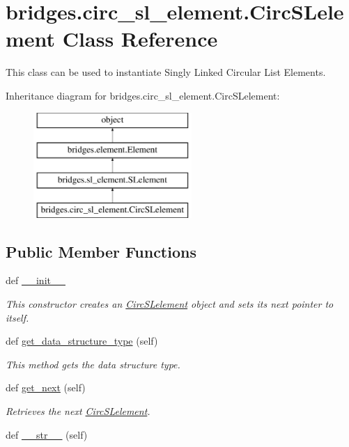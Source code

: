 \hypertarget{classbridges_1_1circ__sl__element_1_1_circ_s_lelement}{}\section{bridges.\+circ\+\_\+sl\+\_\+element.\+Circ\+S\+Lelement Class Reference}
\label{classbridges_1_1circ__sl__element_1_1_circ_s_lelement}


This class can be used to instantiate Singly Linked Circular List Elements.  


Inheritance diagram for bridges.\+circ\+\_\+sl\+\_\+element.\+Circ\+S\+Lelement\+:\begin{figure}[H]
\begin{center}
\leavevmode
\includegraphics[height=4.000000cm]{classbridges_1_1circ__sl__element_1_1_circ_s_lelement}
\end{center}
\end{figure}
\subsection*{Public Member Functions}
\begin{DoxyCompactItemize}
\item 
def \hyperlink{classbridges_1_1circ__sl__element_1_1_circ_s_lelement_a71244079263999a87ada59f5f3deba07}{\+\_\+\+\_\+init\+\_\+\+\_\+}
\begin{DoxyCompactList}\small\item\em This constructor creates an \hyperlink{classbridges_1_1circ__sl__element_1_1_circ_s_lelement}{Circ\+S\+Lelement} object and sets its next pointer to itself. \end{DoxyCompactList}\item 
def \hyperlink{classbridges_1_1circ__sl__element_1_1_circ_s_lelement_a82b1dbb8592c943eb68161ee60ac3492}{get\+\_\+data\+\_\+structure\+\_\+type} (self)
\begin{DoxyCompactList}\small\item\em This method gets the data structure type. \end{DoxyCompactList}\item 
def \hyperlink{classbridges_1_1circ__sl__element_1_1_circ_s_lelement_acd9041487068ad5b8e9b68dfcdff4829}{get\+\_\+next} (self)
\begin{DoxyCompactList}\small\item\em Retrieves the next \hyperlink{classbridges_1_1circ__sl__element_1_1_circ_s_lelement}{Circ\+S\+Lelement}. \end{DoxyCompactList}\item 
def \hyperlink{classbridges_1_1circ__sl__element_1_1_circ_s_lelement_af43d07b196276fea57e9d43caf9f6c98}{\+\_\+\+\_\+str\+\_\+\+\_\+} (self)
\end{DoxyCompactItemize}
